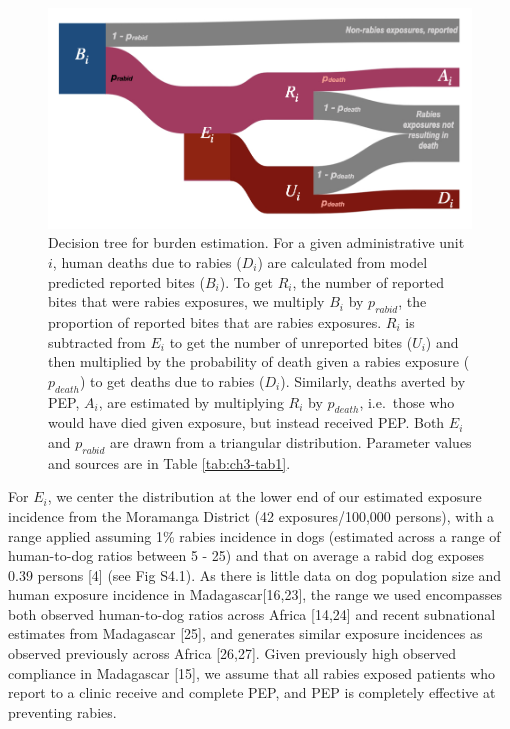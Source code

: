 \documentclass[
  oneside]{book}
\begin{document}
\begin{figure}
\includegraphics[width=0.9\linewidth]{figs/ch2/fig1} \caption[Decision tree for burden estimation given model predicted bite incidence spatially.]{Decision tree for burden estimation. For a given administrative unit \(i\), human deaths due to rabies (\(D_{i}\)) are calculated from model predicted reported bites
(\(B_{i}\)). To get \(R_{i}\), the number of reported bites that were
rabies exposures, we multiply \(B_{i}\) by \(p_{rabid}\), the proportion
of reported bites that are rabies exposures. \(R_{i}\) is subtracted
from \(E_{i}\) to get the number of unreported bites (\(U_{i}\)) and
then multiplied by the probability of death given a rabies exposure
(\(p_{death}\)) to get deaths due to rabies (\(D_{i}\)). Similarly,
deaths averted by PEP, \(A_{i}\), are estimated by multiplying \(R_{i}\)
by \(p_{death}\), i.e.~those who would have died given exposure, but
instead received PEP. Both \(E_{i}\) and \(p_{rabid}\) are drawn from a
triangular distribution. Parameter values and sources are in Table \ref{tab:ch3-tab1}.}\label{fig:ch3-fig1}
\end{figure}













For \(E_{i}\), we center the distribution at the lower end of our
estimated exposure incidence from the Moramanga District (42
exposures/100,000 persons), with a range applied assuming 1\% rabies
incidence in dogs (estimated across a range of human-to-dog ratios
between 5 - 25) and that on average a rabid dog exposes 0.39 persons
{[}4{]} (see Fig S4.1). As there is little data on dog population size and
human exposure incidence in Madagascar{[}16,23{]}, the range we used
encompasses both observed human-to-dog ratios across Africa {[}14,24{]}
and recent subnational estimates from Madagascar {[}25{]}, and generates
similar exposure incidences as observed previously across Africa
{[}26,27{]}. Given previously high observed compliance in Madagascar
{[}15{]}, we assume that all rabies exposed patients who report to a
clinic receive and complete PEP, and PEP is completely effective at
preventing rabies.
\end{document}
